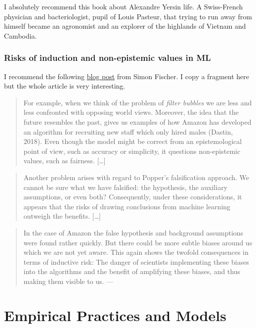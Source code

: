 \documentclass[
]{book}
\begin{document}
I absolutely recommend this book about Alexandre Yersin life. A Swiss-French physician and bacteriologist, pupil of Louis Pasteur, that trying to run away from himself became an agronomist and an explorer of the highlands of Vietnam and Cambodia.

\hypertarget{risks-of-induction-and-non-epistemic-values-in-ml}{%
\subsection{Risks of induction and non-epistemic values in ML}\label{risks-of-induction-and-non-epistemic-values-in-ml}}

I recommend the following \href{https://simonfischer.me/the-necessity-of-non-epistemic-values-in-machine-learning-modelling/}{blog post} from Simon Fischer. I copy a fragment here but the whole article is very interesting.

\begin{quote}
For example, when we think of the problem of \emph{filter bubbles} we are less and less confronted with opposing world views. Moreover, the idea that the future resembles the past, gives us examples of how Amazon has developed an algorithm for recruiting new staff which only hired males (Dastin, 2018). Even though the model might be correct from an epistemological point of view, such as accuracy or simplicity, it questions non-epistemic values, such as fairness. {[}\ldots{]}
\end{quote}

\begin{quote}
Another problem arises with regard to Popper's falsification approach. We cannot be sure what we have falsified: the hypothesis, the auxiliary assumptions, or even both? Consequently, under these considerations, it appears that the risks of drawing conclusions from machine learning outweigh the benefits. {[}\ldots{]}
\end{quote}

\begin{quote}
In the case of Amazon the false hypothesis and background assumptions were found rather quickly. But there could be more subtle biases around us which we are not yet aware. This again shows the twofold consequences in terms of inductive risk: The danger of scientists implementing these biases into the algorithms and the benefit of amplifying these biases, and thus making them visible to us. --- \citep{fischer_2020}
\end{quote}

\hypertarget{empirical-practices}{%
\chapter{Empirical Practices and Models}\label{empirical-practices}}
\end{document}
